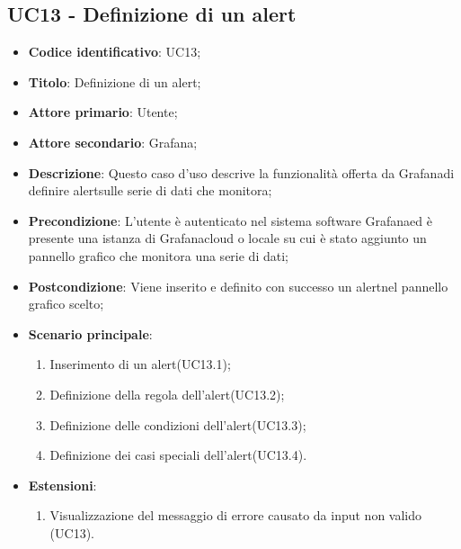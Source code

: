 \subsection{UC13 - Definizione di un alert}
\begin{itemize}
	\item \textbf{Codice identificativo}: UC13;
	\item \textbf{Titolo}: Definizione di un alert\glo;
	\item \textbf{Attore primario}: Utente;
	\item \textbf{Attore secondario}: Grafana\glo;
	\item \textbf{Descrizione}: Questo caso d'uso descrive la funzionalità offerta da Grafana\glosp di definire alert\glosp sulle serie di dati che monitora;
	\item \textbf{Precondizione}: L'utente è autenticato nel sistema software Grafana\glosp ed è presente una istanza di Grafana\glosp cloud o locale su cui è stato aggiunto un pannello grafico che monitora una serie di dati;
	\item \textbf{Postcondizione}: Viene inserito e definito con successo un alert\glosp nel pannello grafico scelto;
	\item \textbf{Scenario principale}: 
	\begin{enumerate}
		\item Inserimento di un alert\glosp (UC13.1);
		\item Definizione della regola dell'alert\glosp (UC13.2);
		\item Definizione delle condizioni dell'alert\glosp (UC13.3);
		\item Definizione dei casi speciali dell'alert\glosp (UC13.4).
	\end{enumerate}

	\item \textbf{Estensioni}:	
	\begin{enumerate}
		\item Visualizzazione del messaggio di errore causato da input non valido (UC13).
	\end{enumerate}
\end{itemize}

